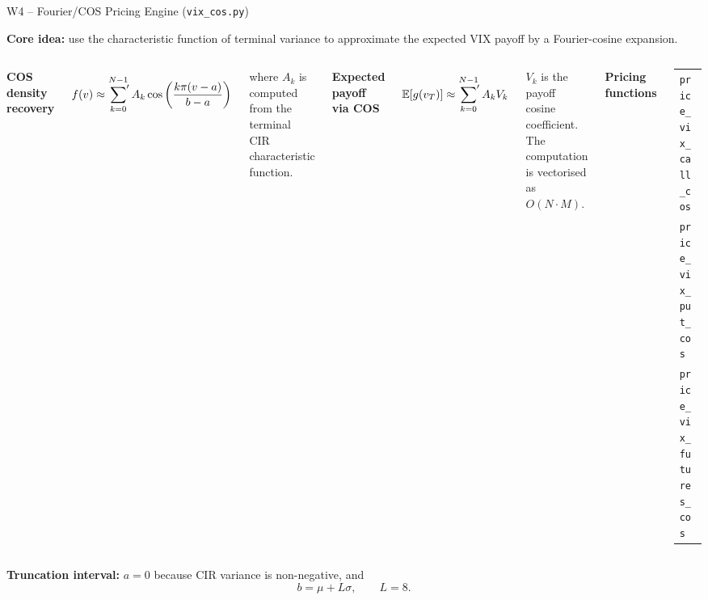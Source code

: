 \documentclass[aspectratio=169, 11pt]{beamer}
\begin{document}
\begin{frame}{W4 -- Fourier/COS Pricing Engine \;(\texttt{vix\_cos.py})}

\textbf{Core idea:} use the characteristic function of terminal variance to approximate the expected VIX payoff by a Fourier-cosine expansion.

\vspace{6pt}

\begin{columns}[T,totalwidth=\textwidth]

\textbf{COS density recovery}

\vspace{2pt}
{\scriptsize
\[
  f(v)
  \approx
  \sideset{}{'}\sum_{k=0}^{N-1}
  A_k
  \cos\left(
  \frac{k\pi(v-a)}{b-a}
  \right)
\]
}

{\small
where \(A_k\) is computed from the terminal CIR characteristic function.
}

\textbf{Expected payoff via COS}

\vspace{2pt}
{\scriptsize
\[
  \mathbb{E}[g(v_T)]
  \approx
  \sideset{}{'}\sum_{k=0}^{N-1}
  A_k V_k
\]
}

{\small
\(V_k\) is the payoff cosine coefficient. The computation is vectorised as \(O(N\cdot M)\).
}

\textbf{Pricing functions}

\vspace{4pt}
{\scriptsize
\begin{tabular}{@{}l@{}}
\texttt{price\_vix\_call\_cos} \\[5pt]
\texttt{price\_vix\_put\_cos} \\[5pt]
\texttt{price\_vix\_futures\_cos}
\end{tabular}
}

\end{columns}

\vspace{8pt}

\textbf{Truncation interval:}\;
\(a=0\) because CIR variance is non-negative, and
\[
  b=\mu+L\sigma,
  \qquad L=8.
\]

\end{frame}
\end{document}
